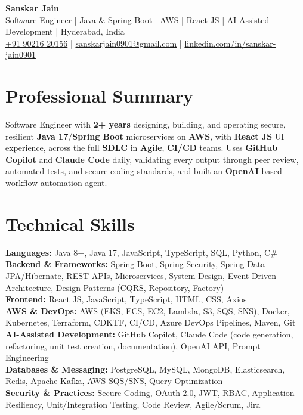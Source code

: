 \documentclass[a4paper,10pt]{article}
\begin{document}
\begin{center}
    {\LARGE \textbf{Sanskar Jain}} \\
    \vspace{2pt}
    Software Engineer \;|\; Java \& Spring Boot \;|\; AWS \;|\; React JS \;|\; AI-Assisted Development \;|\; Hyderabad, India \\
    \vspace{2pt}
    \href{tel:+919021620156}{+91 90216 20156} \;|\;
    \href{mailto:sanskarjain0901@gmail.com}{sanskarjain0901@gmail.com} \;|\;
    \href{https://www.linkedin.com/in/sanskar-jain0901/}{linkedin.com/in/sanskar-jain0901}
\end{center}

\section*{Professional Summary}
Software Engineer with \textbf{2+ years} designing, building, and operating secure, resilient \textbf{Java 17}/\textbf{Spring Boot} microservices on \textbf{AWS}, with \textbf{React JS} UI experience, across the full \textbf{SDLC} in \textbf{Agile}, \textbf{CI/CD} teams.
Uses \textbf{GitHub Copilot} and \textbf{Claude Code} daily, validating every output through peer review, automated tests, and secure coding standards, and built an \textbf{OpenAI}-based workflow automation agent.

\section*{Technical Skills}
\begin{sloppypar}
\noindent
\textbf{Languages:} Java 8+, Java 17, JavaScript, TypeScript, SQL, Python, C\# \\
\textbf{Backend \& Frameworks:} Spring Boot, Spring Security, Spring Data JPA/Hibernate, REST APIs, Microservices, System Design, Event-Driven Architecture, Design Patterns (CQRS, Repository, Factory) \\
\textbf{Frontend:} React JS, JavaScript, TypeScript, HTML, CSS, Axios \\
\textbf{AWS \& DevOps:} AWS (EKS, ECS, EC2, Lambda, S3, SQS, SNS), Docker, Kubernetes, Terraform, CDKTF, CI/CD, Azure DevOps Pipelines, Maven, Git \\
\textbf{AI-Assisted Development:} GitHub Copilot, Claude Code (code generation, refactoring, unit test creation, documentation), OpenAI API, Prompt Engineering \\
\textbf{Databases \& Messaging:} PostgreSQL, MySQL, MongoDB, Elasticsearch, Redis, Apache Kafka, AWS SQS/SNS, Query Optimization \\
\textbf{Security \& Practices:} Secure Coding, OAuth 2.0, JWT, RBAC, Application Resiliency, Unit/Integration Testing, Code Review, Agile/Scrum, Jira
\end{sloppypar}
\end{document}
